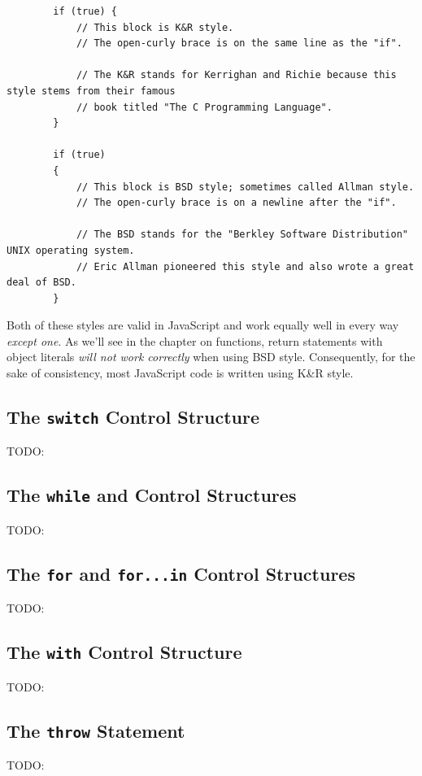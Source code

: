 \documentclass[11pt,letter]{book}
\begin{document}
    \begin{verbatim}
        if (true) {
            // This block is K&R style. 
            // The open-curly brace is on the same line as the "if".
            
            // The K&R stands for Kerrighan and Richie because this style stems from their famous 
            // book titled "The C Programming Language".
        }
        
        if (true)
        {
            // This block is BSD style; sometimes called Allman style.
            // The open-curly brace is on a newline after the "if".
            
            // The BSD stands for the "Berkley Software Distribution" UNIX operating system. 
            // Eric Allman pioneered this style and also wrote a great deal of BSD.
        }
    \end{verbatim}
    
    Both of these styles are valid in JavaScript and work equally well in every way \emph{except
    one}. As we'll see in the chapter on functions, return statements with object literals 
    \emph{will not work correctly} when using BSD style. Consequently, for the sake of consistency, 
    most JavaScript code is written using K\&R style.
    
    \subsection{The \texttt{switch} Control Structure}
    TODO:
    
    \subsection{The \texttt{while} and  Control Structures}
    TODO:
    
    \subsection{The \texttt{for} and \texttt{for...in} Control Structures}
    TODO:
    
    \subsection{The \texttt{with} Control Structure}
    TODO:
    
    \subsection{The \texttt{throw} Statement}
    TODO:
    
\end{document}
